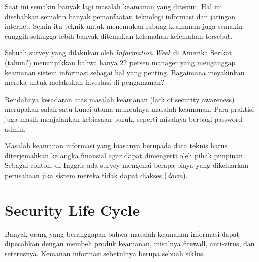 Saat ini semakin banyak lagi masalah keamanan yang ditemui.
Hal ini disebabkan semakin banyak pemanfaatan teknologi informasi dan
jaringan internet.
Selain itu teknik untuk menemukan lubang keamanan juga semakin
canggih sehingga lebih banyak ditemukan kelemahan-kelemahan tersebut.

Sebuah survey yang dilakukan oleh {\em Information Week} di Amerika
Serikat (tahun?) menunjukkan bahwa hanya 22 persen manager yang
menganggap keamanan sistem informasi sebagai hal yang penting.
Bagaimana meyakinkan mereka untuk melakukan investasi di pengamanan?

Rendahnya kesadaran atas masalah keamanan (lack of security awareness)
merupakan salah satu kunci utama munculnya masalah keamanan.
Para praktisi juga masih menjalankan kebiasaan buruk,
seperti misalnya berbagi password admin.

Masalah keamanan informasi yang biasanya berupada data teknis
harus diterjemahkan ke angka finansial agar dapat dimengerti 
oleh pihak pimpinan.
Sebagai contoh, di Inggris ada survey mengenai berapa biaya
yang dikeluarkan perusahaan jika sistem mereka tidak dapat
diakses ({\em down}).



\section{Security Life Cycle}
Banyak orang yang beranggapan bahwa masalah keamanan informasi
dapat dipecahkan dengan membeli produk keamanan,
misalnya firewall, anti-virus, dan seterusnya.
Kemanan informasi sebetulnya berupa sebuah siklus.


